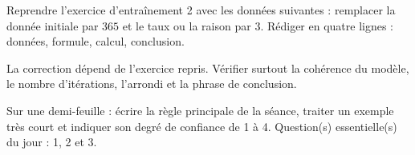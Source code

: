 
\begin{homework}Reprendre l'exercice d'entraînement 2 avec les données suivantes : remplacer la donnée initiale par $365$ et le taux ou la raison par $3$. Rédiger en quatre lignes : données, formule, calcul, conclusion.\end{homework}
\begin{solution}La correction dépend de l'exercice repris. Vérifier surtout la cohérence du modèle, le nombre d'itérations, l'arrondi et la phrase de conclusion.\end{solution}

\begin{exitticket}[3 minutes]Sur une demi-feuille : écrire la règle principale de la séance, traiter un exemple très court et indiquer son degré de confiance de 1 à 4. Question(s) essentielle(s) du jour : 1, 2 et 3.\end{exitticket}

